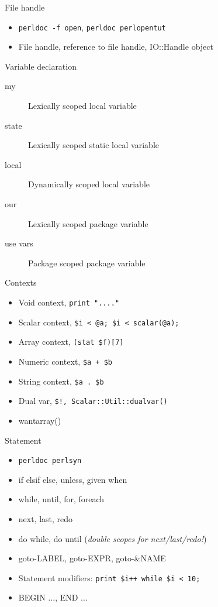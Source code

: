 \documentclass{beamer}
\begin{document}
\begin{frame}{File handle}
  \begin{itemize}
    \item \texttt{perldoc -f open}, \texttt{perldoc perlopentut}
    \item File handle, reference to file handle, IO::Handle object
  \end{itemize}
\end{frame}

\begin{frame}{Variable declaration}
  \begin{description}
    \item[my]       Lexically scoped local variable
    \item[state]    Lexically scoped static local variable
    \item[local]    Dynamically scoped local variable
    \item[our]      Lexically scoped package variable
    \item[use vars] Package scoped package variable
  \end{description}
\end{frame}

\begin{frame}{Contexts}
  \begin{itemize}
    \item Void context, \texttt{print "...."}
    \item Scalar context, \texttt{\$i < @a; \$i < scalar(@a);}
    \item Array context, \texttt{(stat \$f)[7]}
    \item Numeric context, \texttt{\$a + \$b}
    \item String context, \texttt{\$a\ .\ \$b}
    \item Dual var, \texttt{\$!, Scalar::Util::dualvar()}
    \item wantarray()
  \end{itemize}
\end{frame}

\begin{frame}{Statement}
  \begin{itemize}
    \item \texttt{perldoc perlsyn}
    \item if elsif else, unless, given when
    \item while, until, for, foreach
    \item next, last, redo
    \item do while, do until (\emph{double scopes for next/last/redo!})
    \item goto-LABEL, goto-EXPR, goto-\&NAME
    \item Statement modifiers: \texttt{print \$i++ while \$i < 10;}
    \item BEGIN {...}, END {...}
  \end{itemize}
\end{frame}
\end{document}

